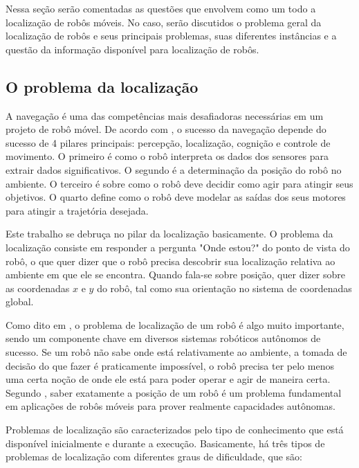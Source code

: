 \documentclass[acronym, symbols, table]{fei}
\begin{document}
		Nessa seção serão comentadas as questões que envolvem como um todo a localização de robôs móveis. No caso, serão discutidos o problema geral da localização de robôs e seus principais problemas, suas diferentes instâncias e a questão da informação disponível para localização de robôs.
		
		\subsection{O problema da localização}
		
			A navegação é uma das competências mais desafiadoras necessárias em um projeto de robô móvel. De acordo com \textcite{siegwart2011introduction}, o sucesso da navegação depende do sucesso de 4 pilares principais: percepção, localização, cognição e controle de movimento. O primeiro é como o robô interpreta os dados dos sensores para extrair dados significativos. O segundo é a determinação da posição do robô no ambiente. O terceiro é sobre como o robô deve decidir como agir para atingir seus objetivos. O quarto define como o robô deve modelar as saídas dos seus motores para atingir a trajetória desejada.
			
			Este trabalho se debruça no pilar da localização basicamente. O problema da localização consiste em responder a pergunta "Onde estou?" do ponto de vista do robô, o que quer dizer que o robô precisa descobrir sua localização relativa ao ambiente em que ele se encontra. Quando fala-se sobre posição, quer dizer sobre as coordenadas $x$ e $y$ do robô, tal como sua orientação no sistema de coordenadas global.
			
			Como dito em \textcite{thrun2001robust}, o problema de localização de um robô é algo muito importante, sendo um componente chave em diversos sistemas robóticos autônomos de sucesso. Se um robô não sabe onde está relativamente ao ambiente, a tomada de decisão do que fazer é praticamente impossível, o robô precisa ter pelo menos uma certa noção de onde ele está para poder operar e agir de maneira certa. Segundo \textcite{borenstein1997mobile}, saber exatamente a posição de um robô é um problema fundamental em aplicações de robôs móveis para prover realmente capacidades autônomas.
			
			Problemas de localização são caracterizados pelo tipo de conhecimento que está disponível inicialmente e durante a execução. Basicamente, há três tipos de problemas de localização com diferentes graus de dificuldade, que são:
			
\end{document}
